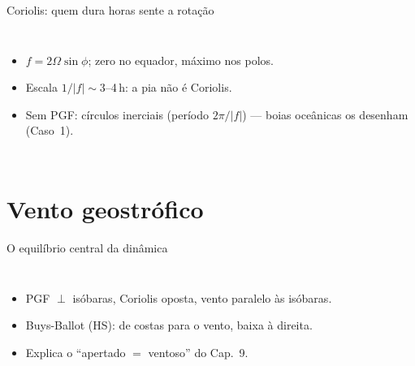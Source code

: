 \documentclass[aspectratio=169,11pt]{beamer}
\begin{document}
\begin{frame}{Coriolis: quem dura horas sente a rotação}
  \begin{columns}
    \begin{itemize}
      \item $f = 2\Omega\sin\phi$; zero no equador, máximo nos polos.
      \item Escala $1/|f| \sim 3$--4\,h: a pia \alert{não} é Coriolis.
      \item Sem PGF: círculos inerciais (período $2\pi/|f|$) — boias
            oceânicas os desenham (Caso~1).
    \end{itemize}
  \end{columns}
\end{frame}

\section{Vento geostrófico}

\begin{frame}{O equilíbrio central da dinâmica}
  \begin{columns}
    \vspace{0.4em}
    \begin{itemize}
      \item PGF $\perp$ isóbaras, Coriolis oposta, vento
            \alert{paralelo às isóbaras}.
      \item Buys-Ballot (HS): de costas para o vento, baixa à
            \alert{direita}.
      \item Explica o ``apertado $=$ ventoso'' do Cap.~9.
    \end{itemize}
  \end{columns}
\end{frame}
\end{document}
